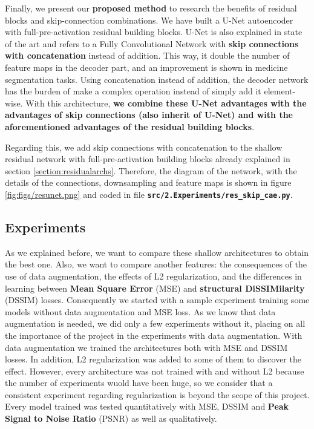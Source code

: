 Finally, we present our \textbf{proposed method} to research the benefits of residual blocks and skip-connection combinations. We have built a U-Net autoencoder with full-pre-activation residual building blocks. U-Net is also explained in state of the art and refers to a Fully Convolutional Network with \textbf{skip connections with concatenation} instead of addition. This way, it double the number of feature maps in the decoder part, and an improvement is shown in medicine segmentation tasks. Using concatenation instead of addition, the decoder network has the burden of make a complex operation instead of simply add it element-wise. With this architecture, \textbf{we combine these U-Net advantages with the advantages of skip connections (also inherit of U-Net) and with the aforementioned advantages of the residual building blocks}.

Regarding this, we add skip connections with concatenation to the shallow residual network with full-pre-activation building blocks already explained in section \ref{section:residualarchs}. Therefore, the diagram of the network, with the details of the connections, downsampling and feature maps is shown in figure \ref{fig:figs/resunet.png} and coded in file \textbf{\texttt{src/2.Experiments\-/res\_sk\-ip\_cae.py}}.



\subsection{Experiments}
\label{subsection:experiments}

As we explained before, we want to compare these shallow architectures to obtain the best one. Also, we want to compare another features: the consequences of the use of data augmentation, the effects of L2 regularization, and the differences in learning between\textbf{ Mean Square Error} (MSE) and \textbf{structural DiSSIMilarity} (DSSIM) losses. Consequently we started with a sample experiment training some models without data augmentation and MSE loss. As we know that data augmentation is needed, we did only a few experiments without it, placing on all the importance of the project in the experiments with data augmentation. With data augmentation we trained the architectures both with MSE and DSSIM losses. In addition, L2 regularization was added to some of them to discover the effect. However, every architecture was not trained with and without L2 because the number of experiments wuold have been huge, so we consider that a consistent experiment regarding regularization is beyond the scope of this project. Every model trained was tested quantitatively with MSE, DSSIM and \textbf{Peak Signal to Noise Ratio} (PSNR) as well as qualitatively.

